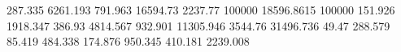 287.335    6261.193   %
791.963    16594.73   %
2237.77    100000     %
18596.8615 100000     %
151.926    1918.347   %
386.93     4814.567   %
932.901    11305.946  %
3544.76    31496.736  %
49.47      288.579    %
85.419     484.338    %
174.876    950.345    %
410.181    2239.008   %

